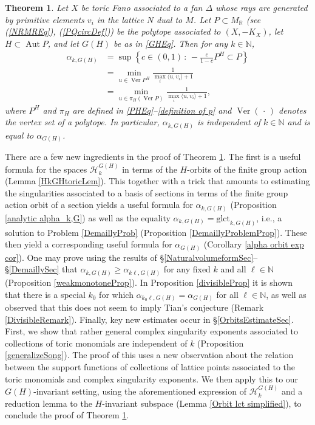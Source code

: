 \documentclass{article}
\newcommand\cH{{\mathcal H}}
\newcommand{\glct}{\mathrm{glct}}
\newcommand{\NN}{{\mathbb N}}
\newcommand{\RR}{{\mathbb R}}
\renewcommand{\>}{\rightarrow}
\DeclareMathOperator{\Aut}{Aut}
\DeclareMathOperator{\Ver}{Ver}
\theoremstyle{plain}
\newtheorem{theorem}{Theorem}[section]
\theoremstyle{definition}
\def\lb#1{\label{#1}}
\begin{document}
\begin{theorem}\label{alpha_k,Gformula}
    Let $X$ be toric Fano associated to a fan $\Delta$ whose
    rays are generated by primitive elements $v_i$ in the lattice $N$ dual to $M$. 
    Let $P\subset M_\RR$ (see (\ref{NRMREq}), (\ref{PQcircDef})) be 
the polytope associated to $(X,-K_X)$, 
let
    $H\subset\Aut P$, and let $G(H)$ be as in \eqref{GHEq}.
Then
    for any $k\in\NN$, 
    \begin{align}
        \alpha_{k,G(H)}&=\sup\left\{c\in(0,1)\,:\,-\frac{c}{1-c}P^H\subset P\right\}\nonumber\\
        &=\min_{u\in\Ver P^H}\frac{1}{
        \max_i\langle u,v_i\rangle+1}    \lb{MainTheoremEq}\\
        &=\min_{u\in \pi_H(\Ver P)}\frac{1}{\max_i\langle u,v_i\rangle+1},\nonumber
    \end{align}
     where $P^H$ and $\pi_H$ are defined in 
     \eqref{PHEq}--\eqref{definition of p} and $\Ver(\,\cdot\,)$ denotes the vertex set of a polytope. 
    In particular, $\alpha_{k,G(H)}$ is independent of $k\in\NN$ and is equal to $\alpha_{G(H)}$.
\end{theorem}

There are a few new ingredients in the proof of Theorem \ref{alpha_k,Gformula}. The first is  a useful formula for the spaces $\cH_{k}^{G(H)}$ in terms
of the $H$-orbits of the finite group action (Lemma 
\ref{HkGHtoricLem}). This together with a trick that amounts
to estimating the singularities associated to a basis of sections
in terms of the finite group action orbit of a section yields
a useful formula for $\alpha_{k,G(H)}$ 
(Proposition \ref{analytic alpha_k,G}) as well as 
the equality $\alpha_{k,G(H)}=\glct_{k,G(H)}$, i.e.,
a solution to Problem \ref{DemaillyProb} 
(Proposition \ref{DemaillyProblemProp}).
These then yield a corresponding useful formula for
$\alpha_{G(H)}$ (Corollary \ref{alpha orbit exp cor}). 
One may prove using the results of 
\S\ref{NaturalvolumeformSec}--\S\ref{DemaillySec}
that $\alpha_{k,G(H)}\ge \alpha_{k\ell,G(H)}$  
for any fixed $k$ and all $\ell\in\NN$ (Proposition \ref{weakmonotoneProp}).
In Proposition \ref{divisibleProp} it is shown that there is a special $k_0$
for which $\alpha_{k_0\ell,G(H)}=\alpha_{G(H)}$ for all $\ell\in\NN$, as well as 
observed that this does not seem to imply Tian's conjecture (Remark
\ref{DivisibleRemark}). 
Finally, key new estimates occur in \S\ref{OrbitsEstimateSec}. First, we show that rather general
complex singularity exponents associated to collections of toric monomials are independent of $k$ (Proposition \ref{generalizeSong}).
The proof of this uses a new observation about the
relation between the support functions of collections of lattice points associated to the toric monomials and complex singularity exponents. We then apply this to our $G(H)$-invariant setting, using
the aforementioned expression of $\cH_k^{G(H)}$ and a reduction lemma
to the $H$-invariant subspace (Lemma \ref{Orbit lct simplified}),
to conclude the proof of Theorem \ref{alpha_k,Gformula}.
\end{document}
